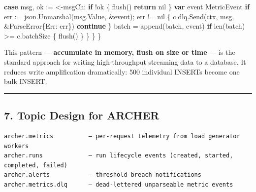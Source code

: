 \documentclass[
]{article}
\newenvironment{Shaded}{}{}
\newcommand{\BuiltInTok}[1]{\textcolor[rgb]{0.00,0.50,0.00}{#1}}
\newcommand{\ControlFlowTok}[1]{\textcolor[rgb]{0.00,0.44,0.13}{\textbf{#1}}}
\newcommand{\KeywordTok}[1]{\textcolor[rgb]{0.00,0.44,0.13}{\textbf{#1}}}
\newcommand{\NormalTok}[1]{#1}
\newcommand{\OperatorTok}[1]{\textcolor[rgb]{0.40,0.40,0.40}{#1}}
\newcommand{\OtherTok}[1]{\textcolor[rgb]{0.00,0.44,0.13}{#1}}
\begin{document}
\begin{Shaded}
\begin{Highlighting}[]
        \ControlFlowTok{case}\NormalTok{ msg}\OperatorTok{,}\NormalTok{ ok }\OperatorTok{:=} \OperatorTok{\textless{}{-}}\NormalTok{msgCh}\OperatorTok{:}
            \ControlFlowTok{if} \OperatorTok{!}\NormalTok{ok }\OperatorTok{\{}
\NormalTok{                flush}\OperatorTok{()}
                \ControlFlowTok{return} \OtherTok{nil}
            \OperatorTok{\}}
            \KeywordTok{var}\NormalTok{ event MetricEvent}
            \ControlFlowTok{if}\NormalTok{ err }\OperatorTok{:=}\NormalTok{ json}\OperatorTok{.}\NormalTok{Unmarshal}\OperatorTok{(}\NormalTok{msg}\OperatorTok{.}\NormalTok{Value}\OperatorTok{,} \OperatorTok{\&}\NormalTok{event}\OperatorTok{);}\NormalTok{ err }\OperatorTok{!=} \OtherTok{nil} \OperatorTok{\{}
\NormalTok{                c}\OperatorTok{.}\NormalTok{dlq}\OperatorTok{.}\NormalTok{Send}\OperatorTok{(}\NormalTok{ctx}\OperatorTok{,}\NormalTok{ msg}\OperatorTok{,} \OperatorTok{\&}\NormalTok{ParseError}\OperatorTok{\{}\NormalTok{Err}\OperatorTok{:}\NormalTok{ err}\OperatorTok{\})}
                \ControlFlowTok{continue}
            \OperatorTok{\}}
\NormalTok{            batch }\OperatorTok{=} \BuiltInTok{append}\OperatorTok{(}\NormalTok{batch}\OperatorTok{,}\NormalTok{ event}\OperatorTok{)}
            \ControlFlowTok{if} \BuiltInTok{len}\OperatorTok{(}\NormalTok{batch}\OperatorTok{)} \OperatorTok{\textgreater{}=}\NormalTok{ c}\OperatorTok{.}\NormalTok{batchSize }\OperatorTok{\{}
\NormalTok{                flush}\OperatorTok{()}
            \OperatorTok{\}}
        \OperatorTok{\}}
    \OperatorTok{\}}
\OperatorTok{\}}
\end{Highlighting}
\end{Shaded}

This pattern --- \textbf{accumulate in memory, flush on size or time}
--- is the standard approach for writing high-throughput streaming data
to a database. It reduces write amplification dramatically: 500
individual INSERTs become one bulk INSERT.

\begin{center}\rule{0.5\linewidth}{0.5pt}\end{center}

\hypertarget{topic-design-for-archer}{%
\subsection{7. Topic Design for ARCHER}\label{topic-design-for-archer}}

\begin{verbatim}
archer.metrics          — per-request telemetry from load generator workers
archer.runs             — run lifecycle events (created, started, completed, failed)
archer.alerts           — threshold breach notifications
archer.metrics.dlq      — dead-lettered unparseable metric events
\end{verbatim}
\end{document}
